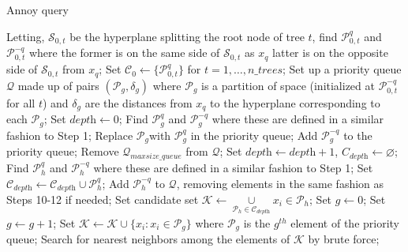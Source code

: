 \documentclass{article}
\begin{document}
\begin{algorithm}[!b]
  \caption{Annoy query}
  \label{alg:annoyquery}
  \begin{algorithmic}[1]
    \STATE Letting, $\mathcal{S}_{0,t}$ be the hyperplane splitting the root node of tree $t$, find $\mathcal{P}^q_{0,t}$ and $\mathcal{P}^{-q}_{0,t}$ where the former is on the same side of $\mathcal{S}_{0,t}$ as $x_q$ latter is on the opposite side of $\mathcal{S}_{0,t}$ from $x_q$;
    \STATE Set $\mathcal{C}_0\leftarrow\{\mathcal{P}^q_{0,t}\}$ for $t=1,\dots,\textit{n\_trees}$;
    \STATE Set up a priority queue $\mathcal{Q}$ made up of pairs $(\mathcal{P}_g,\delta_g)$ where $\mathcal{P}_g$ is a partition of space (initialized at $\mathcal{P}^{-q}_{0,t}$ for all $t$) and $\delta_g$ are the distances from $x_q$ to the hyperplane corresponding to each $\mathcal{P}_g$;
    \STATE Set $\textit{depth}\leftarrow 0$;
    \STATE Find $\mathcal{P}^q_g$ and $\mathcal{P}^{-q}_g$ where these are defined in a similar fashion to Step 1;
    \STATE Replace $\mathcal{P}_g$with $\mathcal{P}^q_g$ in the priority queue;
    \STATE Add $\mathcal{P}^{-q}_g$ to the priority queue;
    \STATE Remove $\mathcal{Q}_{maxsize\_queue}$ from $\mathcal{Q}$;
    \ENDIF
    \ENDFOR
    \STATE Set $\textit{depth}\leftarrow \textit{depth}+1$, $C_{\textit{depth}}\leftarrow\varnothing$;
    \STATE Find $\mathcal{P}^q_h$ and $\mathcal{P}^{-q}_h$ where these are defined in a similar fashion to Step 1;
    \STATE Set $\mathcal{C}_{\textit{depth}}\leftarrow\mathcal{C}_{\textit{depth}}\cup\mathcal{P}^q_h$;
    \STATE Add $\mathcal{P}_h^{-q}$ to $\mathcal{Q}$, removing elements in the same fashion as Steps 10-12 if needed;
    \ENDFOR
    \ENDWHILE
    \STATE Set candidate set $\mathcal{K}\leftarrow\underset{\mathcal{P}_h\in\mathcal{C}_{\textit{depth}}}{\cup}x_i\in\mathcal{P}_h$;
    \STATE Set $g\leftarrow 0$;
    \STATE Set $g\leftarrow g+1$;
    \STATE Set $\mathcal{K}\leftarrow\mathcal{K}\cup\{x_i:x_i\in\mathcal{P}_g\}$ where $\mathcal{P}_g$ is the $g^{th}$ element of the priority queue;
    \ENDWHILE
    \STATE Search for nearest neighbors among the elements of $\mathcal{K}$ by brute force;
  \end{algorithmic}
\end{algorithm}
\end{document}
